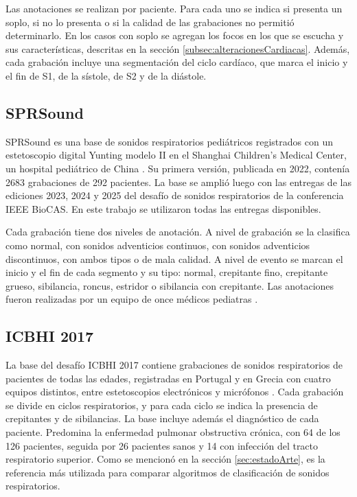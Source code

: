 Las anotaciones se realizan por paciente. Para cada uno se indica si presenta un soplo, si no lo
presenta o si la calidad de las grabaciones no permitió determinarlo. En los casos con soplo se
agregan los focos en los que se escucha y sus características, descritas en la sección
\ref{subsec:alteracionesCardiacas}. Además, cada grabación incluye una segmentación del ciclo
cardíaco, que marca el inicio y el fin de S1, de la sístole, de S2 y de la diástole.

\subsection{SPRSound}
\label{subsec:sprsound}

SPRSound es una base de sonidos respiratorios pediátricos registrados con un estetoscopio digital
Yunting modelo II en el Shanghai Children's Medical Center, un hospital pediátrico de China
\citep{zhang2022sprsound}. Su primera versión, publicada en 2022, contenía 2683 grabaciones de 292
pacientes. La base se amplió luego con las entregas de las ediciones 2023, 2024 y 2025 del desafío
de sonidos respiratorios de la conferencia IEEE BioCAS. En este trabajo se utilizaron todas las
entregas disponibles.

Cada grabación tiene dos niveles de anotación. A nivel de grabación se la clasifica como normal, con
sonidos adventicios continuos, con sonidos adventicios discontinuos, con ambos tipos o de mala
calidad. A nivel de evento se marcan el inicio y el fin de cada segmento y su tipo: normal,
crepitante fino, crepitante grueso, sibilancia, roncus, estridor o sibilancia con crepitante. Las
anotaciones fueron realizadas por un equipo de once médicos pediatras \citep{zhang2022sprsound}.

\subsection{ICBHI 2017}
\label{subsec:icbhi}

La base del desafío ICBHI 2017 contiene grabaciones de sonidos respiratorios de pacientes de todas
las edades, registradas en Portugal y en Grecia con cuatro equipos distintos, entre estetoscopios
electrónicos y micrófonos \citep{rocha2019open}. Cada grabación se divide en ciclos respiratorios, y
para cada ciclo se indica la presencia de crepitantes y de sibilancias. La base incluye además el
diagnóstico de cada paciente. Predomina la enfermedad pulmonar obstructiva crónica, con 64 de los
126 pacientes, seguida por 26 pacientes sanos y 14 con infección del tracto respiratorio superior.
Como se mencionó en la sección \ref{sec:estadoArte}, es la referencia más utilizada para comparar
algoritmos de clasificación de sonidos respiratorios.

